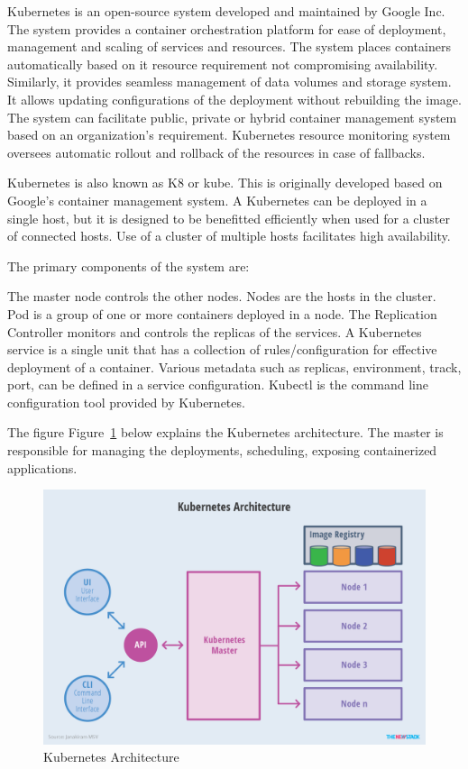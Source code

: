 Kubernetes is an open-source system developed and maintained by Google
Inc.  The system provides a container orchestration platform for ease
of deployment, management and scaling of services and resources. The
system places containers automatically based on it resource
requirement not compromising availability.  Similarly, it provides
seamless management of data volumes and storage system.  It allows
updating configurations of the deployment without rebuilding the
image. The system can facilitate public, private or hybrid container
management system based on an organization's requirement.  Kubernetes
resource monitoring system oversees automatic rollout and rollback of
the resources in case of fallbacks.


Kubernetes is also known as K8 or kube. This is originally developed
based on Google's container management system. A Kubernetes can be
deployed in a single host, but it is designed to be benefitted
efficiently when used for a cluster of connected hosts. Use of a
cluster of multiple hosts facilitates high availability.


The primary components of the system are: 

The master node controls the other nodes. Nodes are the hosts in the
cluster.  Pod is a group of one or more containers deployed in a node.
The Replication Controller monitors and controls the replicas of the
services. A Kubernetes service is a single unit that has a collection
of rules/configuration for effective deployment of a
container. Various metadata such as replicas, environment, track,
port, can be defined in a service configuration.  Kubectl is the
command line configuration tool provided by Kubernetes.

The figure Figure~\ref{fig:kube-archtecture} below explains the
Kubernetes architecture. The master is responsible for managing the
deployments, scheduling, exposing containerized applications.

\begin{figure}[htb]
	\centering\includegraphics[width=\columnwidth]{images/hid_417_Kubernetes-Architecture.png}
  \caption{Kubernetes Architecture~\cite{hid-sp18-417-kubernetes}}
  \label{fig:kube-archtecture}
\end{figure}


